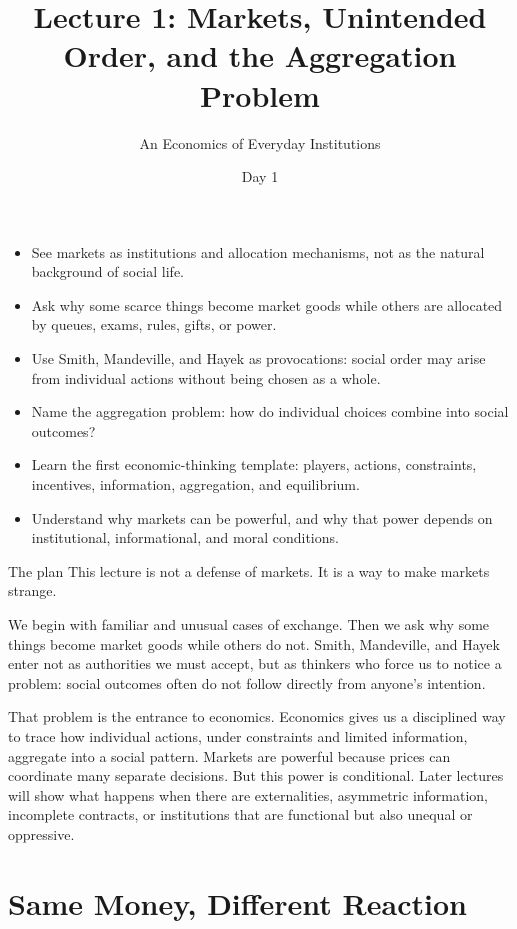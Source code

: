 \documentclass[10pt,a4paper]{article}
\title{\vspace{-2em}\bfseries Lecture 1: Markets, Unintended Order, and the Aggregation Problem}
\author{An Economics of Everyday Institutions}
\date{Day 1}
\begin{document}
\maketitle
\thispagestyle{fancy}

\begin{goalsbox}
\begin{itemize}
  \item See markets as institutions and allocation mechanisms, not as the natural background of social life.
  \item Ask why some scarce things become market goods while others are allocated by queues, exams, rules, gifts, or power.
  \item Use Smith, Mandeville, and Hayek as provocations: social order may arise from individual actions without being chosen as a whole.
  \item Name the aggregation problem: how do individual choices combine into social outcomes?
  \item Learn the first economic-thinking template: players, actions, constraints, incentives, information, aggregation, and equilibrium.
  \item Understand why markets can be powerful, and why that power depends on institutional, informational, and moral conditions.
\end{itemize}
\end{goalsbox}

\begin{keybox}{The plan}
This lecture is not a defense of markets. It is a way to make markets strange.

We begin with familiar and unusual cases of exchange. Then we ask why some things become market goods while others do not. Smith, Mandeville, and Hayek enter not as authorities we must accept, but as thinkers who force us to notice a problem: social outcomes often do not follow directly from anyone's intention.

That problem is the entrance to economics. Economics gives us a disciplined way to trace how individual actions, under constraints and limited information, aggregate into a social pattern. Markets are powerful because prices can coordinate many separate decisions. But this power is conditional. Later lectures will show what happens when there are externalities, asymmetric information, incomplete contracts, or institutions that are functional but also unequal or oppressive.
\end{keybox}

\section{Same Money, Different Reaction}
\end{document}
